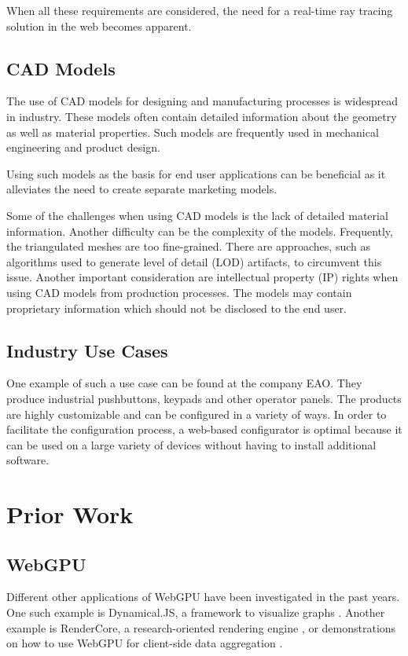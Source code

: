 When all these requirements are considered, the need for a real-time ray tracing solution in the web becomes apparent.

\subsection{CAD Models}

The use of CAD models for designing and manufacturing processes is widespread in industry. These models often contain detailed information about the geometry as well as material properties. Such models are frequently used in mechanical engineering and product design.

Using such models as the basis for end user applications can be beneficial as it alleviates the need to create separate marketing models.

Some of the challenges when using CAD models is the lack of detailed material information. Another difficulty can be the complexity of the models. Frequently, the triangulated meshes are too fine-grained. There are approaches, such as algorithms used to generate level of detail (LOD) artifacts, to circumvent this issue.
Another important consideration are intellectual property (IP) rights when using CAD models from production processes. The models may contain proprietary information which should not be disclosed to the end user.

\subsection{Industry Use Cases}

One example of such a use case can be found at the company EAO. They produce industrial pushbuttons, keypads and other operator panels. The products are highly customizable and can be configured in a variety of ways. In order to facilitate the configuration process, a web-based configurator is optimal because it can be used on a large variety of devices without having to install additional software.

\section{Prior Work}

\subsection{WebGPU}

Different other applications of WebGPU have been investigated in the past years. One such example is Dynamical.JS, a framework to visualize graphs \cite{dotson2022dynamicaljs}. Another example is RenderCore, a research-oriented rendering engine \cite{Bohak_Kovalskyi_Linev_Mrak_Tadel_Strban_Tadel_Yagil_2024}, or demonstrations on how to use WebGPU for client-side data aggregation \cite{kimmersdorfer2023webgpu}.

